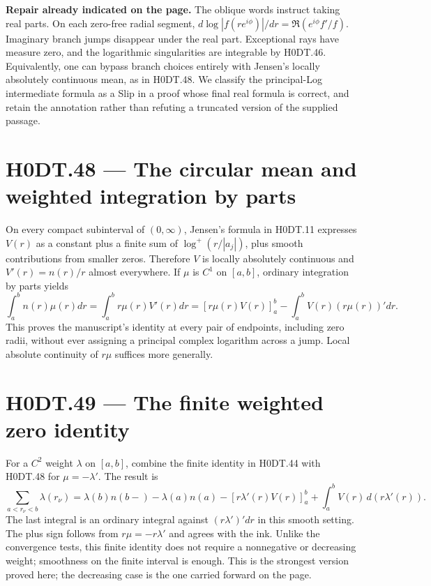 \textbf{Repair already indicated on the page.} The oblique words instruct taking real parts. On each zero-free radial segment, $d\log|f(re^{i\phi})|/dr=\Re(e^{i\phi}f'/f)$. Imaginary branch jumps disappear under the real part. Exceptional rays have measure zero, and the logarithmic singularities are integrable by H0DT.46. Equivalently, one can bypass branch choices entirely with Jensen's locally absolutely continuous mean, as in H0DT.48. We classify the principal-Log intermediate formula as a Slip in a proof whose final real formula is correct, and retain the annotation rather than refuting a truncated version of the supplied passage.

\section*{H0DT.48 --- The circular mean and weighted integration by parts}
On every compact subinterval of $(0,\infty)$, Jensen's formula in H0DT.11 expresses $V(r)$ as a constant plus a finite sum of $\log^+(r/|a_j|)$, plus smooth contributions from smaller zeros. Therefore $V$ is locally absolutely continuous and $V'(r)=n(r)/r$ almost everywhere. If $\mu$ is $C^1$ on $[a,b]$, ordinary integration by parts yields
\[
 \int_a^b n(r)\mu(r)dr
 =\int_a^b r\mu(r)V'(r)dr
 =[r\mu(r)V(r)]_a^b-\int_a^b V(r)(r\mu(r))'dr.
\]
This proves the manuscript's identity at every pair of endpoints, including zero radii, without ever assigning a principal complex logarithm across a jump. Local absolute continuity of $r\mu$ suffices more generally.

\section*{H0DT.49 --- The finite weighted zero identity}
For a $C^2$ weight $\lambda$ on $[a,b]$, combine the finite identity in H0DT.44 with H0DT.48 for $\mu=-\lambda'$. The result is
\[
 \sum_{a<r_\nu<b}\lambda(r_\nu)
 =\lambda(b)n(b-)-\lambda(a)n(a)
 -[r\lambda'(r)V(r)]_a^b
 +\int_a^b V(r)\,d(r\lambda'(r)).
\]
The last integral is an ordinary integral against $(r\lambda')'dr$ in this smooth setting. The plus sign follows from $r\mu=-r\lambda'$ and agrees with the ink. Unlike the convergence tests, this finite identity does not require a nonnegative or decreasing weight; smoothness on the finite interval is enough. This is the strongest version proved here; the decreasing case is the one carried forward on the page.

